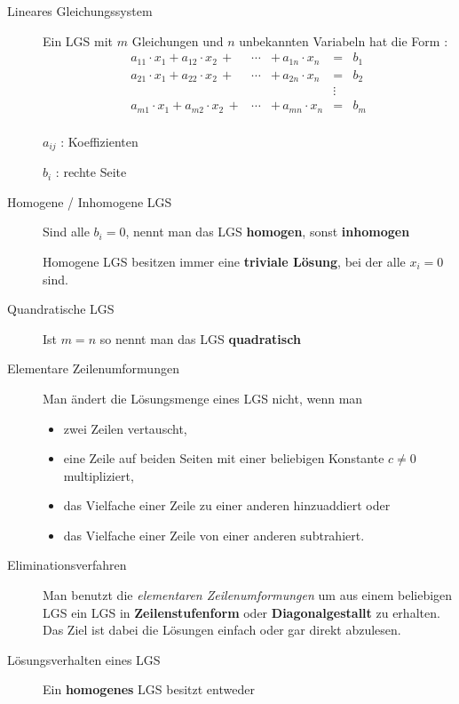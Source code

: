 \documentclass[
  ngerman,
  a4paper,
  landscape, fontsize=9pt, version=first, enabledeprecatedfontcommands,
  DIV=6]{scrartcl}
\providecommand{\tightlist}{%
  \setlength{\itemsep}{0pt}\setlength{\parskip}{0pt}}
\begin{document}
\begin{multicols}{3}
\begin{description}
\item[Lineares Gleichungssystem]
Ein LGS mit \(m\) Gleichungen und \(n\) unbekannten Variabeln hat die
Form :\[\begin{matrix}
    a_{11} \cdot x_1 +  a_{12} \cdot x_2 \, + & \cdots & +\, a_{1n} \cdot x_n & = & b_1\\
    a_{21} \cdot x_1 +  a_{22} \cdot x_2 \, + & \cdots & +\, a_{2n} \cdot x_n & = & b_2\\
    &&&\vdots&\\
    a_{m1} \cdot x_1 +  a_{m2} \cdot x_2 \, + & \cdots & +\, a_{mn} \cdot x_n & = & b_m\\
\end{matrix}\]

\(a_{ij}\) : Koeffizienten

\(b_i\) : rechte Seite
\item[Homogene / Inhomogene LGS]
Sind alle \(b_i=0\), nennt man das LGS \textbf{homogen}, sonst
\textbf{inhomogen}

Homogene LGS besitzen immer eine \textbf{triviale Lösung}, bei der alle
\(x_i=0\) sind.
\item[Quandratische LGS]
Ist \(m=n\) so nennt man das LGS \textbf{quadratisch}
\item[Elementare Zeilenumformungen]
Man ändert die Lösungsmenge eines LGS nicht, wenn man

\begin{itemize}
\tightlist
\item
  zwei Zeilen vertauscht,
\end{itemize}

\begin{itemize}
\tightlist
\item
  eine Zeile auf beiden Seiten mit einer beliebigen Konstante
  \(c \neq 0\) multipliziert,
\end{itemize}

\begin{itemize}
\tightlist
\item
  das Vielfache einer Zeile zu einer anderen hinzuaddiert oder
\end{itemize}

\begin{itemize}
\tightlist
\item
  das Vielfache einer Zeile von einer anderen subtrahiert.
\end{itemize}
\item[Eliminationsverfahren]
Man benutzt die \emph{elementaren Zeilenumformungen} um aus einem
beliebigen LGS ein LGS in \textbf{Zeilenstufenform} oder
\textbf{Diagonalgestallt} zu erhalten. Das Ziel ist dabei die Lösungen
einfach oder gar direkt abzulesen.
\item[Lösungsverhalten eines LGS]
Ein \textbf{homogenes} LGS besitzt entweder


\end{description}
\end{multicols}
\end{document}
